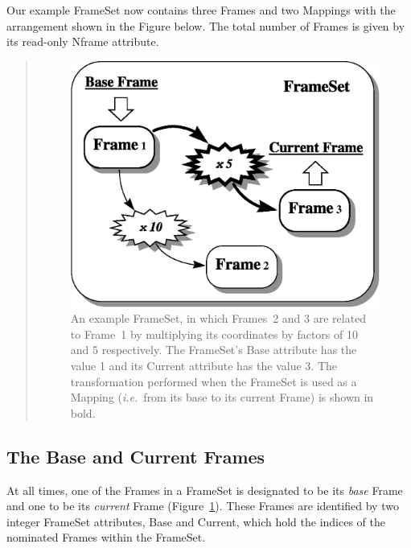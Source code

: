 \documentclass[twoside,11pt]{article}
\newcommand{\htmlref}[2]{#1}
\begin{document}
\begin{htmlonly}
   Our example FrameSet now contains three Frames and two Mappings with
   the arrangement shown in the Figure below. The total number of Frames
   is given by its read-only Nframe attribute.
   \begin{quote}
   \begin{figure}
   \label{fig:fsexample}
   \includegraphics[scale=0.9]{sun211_figures/fsexample.eps}
   \caption{An example FrameSet, in which Frames~2 and 3 are related to
   Frame~1 by multiplying its coordinates by factors of 10 and 5
   respectively. The FrameSet's Base attribute has the value 1 and its
   Current attribute has the value 3. The transformation performed when
   the FrameSet is used as a Mapping ({\em{i.e.}}\ from its base to
   its current Frame) is shown in bold.}
   \end{figure}
   \end{quote}
\end{htmlonly}


\subsection{\label{ss:baseandcurrent}The Base and Current Frames}

At all times, one of the Frames in a \htmlref{FrameSet}{FrameSet} is designated to be its
{\em{base}} \htmlref{Frame}{Frame} and one to be its {\em{current}} Frame
(Figure~\ref{fig:fsexample}). These Frames are identified by two
integer FrameSet attributes, \htmlref{Base}{Base} and \htmlref{Current}{Current}, which hold the indices
of the nominated Frames within the FrameSet.
\end{document}
